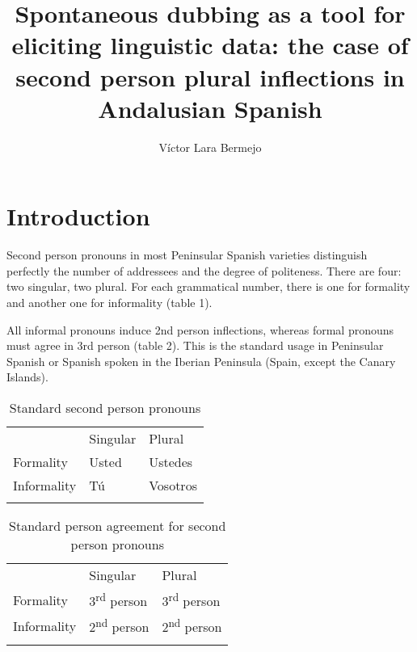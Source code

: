 \documentclass[output=paper]{LSP/langsci}
\author{Víctor Lara Bermejo}
\title{Spontaneous dubbing as a tool for eliciting linguistic data: the case of second person plural inflections in Andalusian Spanish}
\begin{document}
  
%  
 

\section{ Introduction}
Second person pronouns in most Peninsular Spanish varieties distinguish perfectly the number of addressees and the degree of politeness. There are four: two singular, two plural. For each grammatical number, there is one for formality and another one for informality (table 1).

All informal pronouns induce 2nd person inflections, whereas formal pronouns must agree in 3rd person (table 2). This is the standard usage in Peninsular Spanish or Spanish spoken in the Iberian Peninsula (Spain, except the Canary Islands).

\begin{table}
\begin{tabular}{lll} & Singular\par & Plural\par\\
\lsptoprule
 Formality\par & Usted\par & Ustedes\par\\
 Informality\par & Tú\par & Vosotros\par\\
\lspbottomrule
\end{tabular}
\label{tab:1}
\caption{Standard second person pronouns} 
\end{table}

\begin{table}
\begin{tabular}{lll} & Singular\par & Plural\par\\
\lsptoprule
 Formality\par & 3\textsuperscript{rd} person\par & 3\textsuperscript{rd} person\par\\
 Informality\par & 2\textsuperscript{nd} person\par & 2\textsuperscript{nd} person\par\\
\lspbottomrule
\end{tabular}
\label{tab:2}
\caption{Standard person agreement for second person pronouns} 
\end{table}
\end{document}
